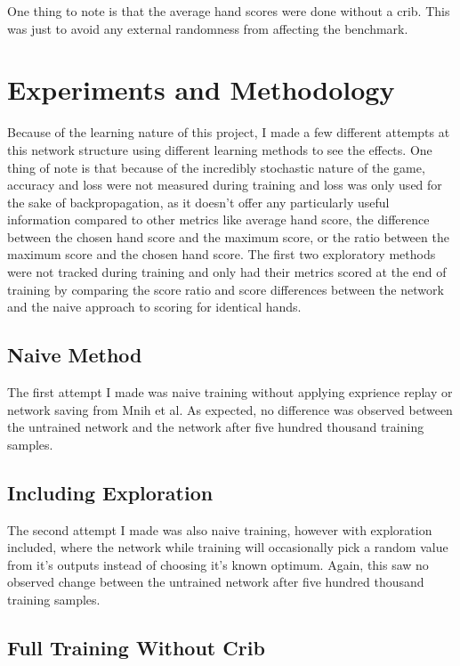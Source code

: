 \documentclass[]{article}
\begin{document}
One thing to note is that the average hand scores were done without a crib. This was just to avoid any external randomness from affecting the benchmark.

\section{Experiments and Methodology}

Because of the learning nature of this project, I made a few different attempts at this network structure using different learning methods to see the effects. One thing of note is that because of the incredibly stochastic nature of the game, accuracy and loss were not measured during training and loss was only used for the sake of backpropagation, as it doesn't offer any particularly useful information compared to other metrics like average hand score, the difference between the chosen hand score and the maximum score, or the ratio between the maximum score and the chosen hand score. The first two exploratory methods were not tracked during training and only had their metrics scored at the end of training by comparing the score ratio and score differences between the network and the naive approach to scoring for identical hands.  

\subsection{Naive Method}

The first attempt I made was naive training without applying exprience replay or network saving from Mnih et al\cite{deepmind_2015}. As expected, no difference was observed between the untrained network and the network after five hundred thousand training samples. 

\subsection{Including Exploration}

The second attempt I made was also naive training, however with exploration included, where the network while training will occasionally pick a random value from it's outputs instead of choosing it's known optimum\cite{drl_survey}. Again, this saw no observed change between the untrained network after five hundred thousand training samples. 

\subsection{Full Training Without Crib}
\end{document}
